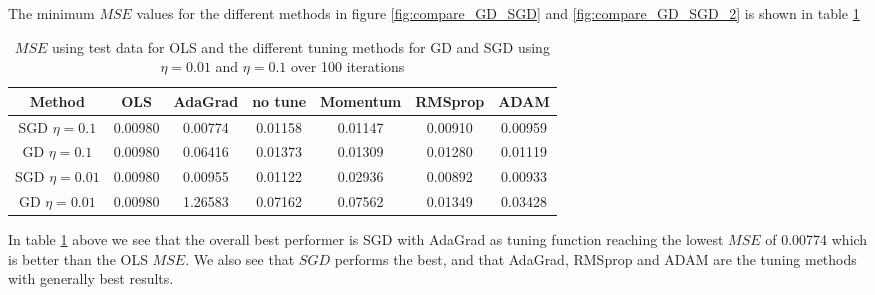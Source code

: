 \documentclass[11pt]{article}
\begin{document}
The minimum $MSE$ values for the different methods in figure \ref{fig:compare_GD_SGD} and \ref{fig:compare_GD_SGD_2} is shown in table \ref{tab:OLS_compare}
\begin{table}[H]
    \centering
    \caption{$MSE$ using test data for OLS and the different tuning methods for GD and SGD using  $\eta=0.01$ and $\eta=0.1$ over 100 iterations}
    \label{tab:OLS_compare}
    \begin{tabular}{|c|c|c|c|c|c|c|}
        \hline
        Method          & OLS     & AdaGrad & no tune & Momentum & RMSprop & ADAM    \\
        \hline
        SGD $\eta=0.1$  & 0.00980 & 0.00774 & 0.01158 & 0.01147  & 0.00910 & 0.00959 \\
        \hline
        GD  $\eta=0.1$  & 0.00980 & 0.06416 & 0.01373 & 0.01309  & 0.01280 & 0.01119 \\
        \hline
        SGD $\eta=0.01$ & 0.00980 & 0.00955 & 0.01122 & 0.02936  & 0.00892 & 0.00933 \\
        \hline
        GD  $\eta=0.01$ & 0.00980 & 1.26583 & 0.07162 & 0.07562  & 0.01349 & 0.03428 \\
        \hline
    \end{tabular}
\end{table}
In table \ref{tab:OLS_compare} above we see that the overall best performer is SGD with AdaGrad as tuning function reaching the lowest $MSE$ of 0.00774 which is better than the OLS $MSE$. We also see that $SGD$ performs the best, and that AdaGrad, RMSprop and ADAM are the tuning methods with generally best results.
\end{document}
